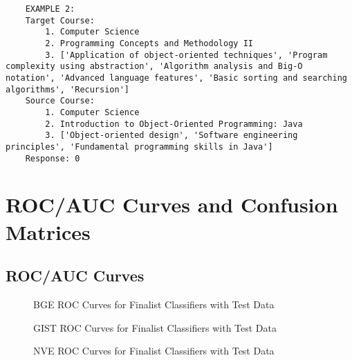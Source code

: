 \begin{lstlisting}
    EXAMPLE 2:
    Target Course:
        1. Computer Science
        2. Programming Concepts and Methodology II
        3. ['Application of object-oriented techniques', 'Program complexity using abstraction', 'Algorithm analysis and Big-O notation', 'Advanced language features', 'Basic sorting and searching algorithms', 'Recursion']
    Source Course:
        1. Computer Science
        2. Introduction to Object-Oriented Programming: Java
        3. ['Object-oriented design', 'Software engineering principles', 'Fundamental programming skills in Java']
    Response: 0
\end{lstlisting}

\chapter{ROC/AUC Curves and Confusion Matrices}

\clearpage
\section{ROC/AUC Curves}

\begin{figure}[!h]
    \captionsetup{skip=5pt}
    \centering
    \caption{BGE ROC Curves for Finalist Classifiers with Test Data}
\end{figure}

\begin{figure}[!h]
    \captionsetup{skip=5pt}
    \centering
    \caption{GIST ROC Curves for Finalist Classifiers with Test Data}
\end{figure}

\begin{figure}[!h]
    \captionsetup{skip=5pt}
    \centering
    \caption{NVE ROC Curves for Finalist Classifiers with Test Data}
\end{figure}

